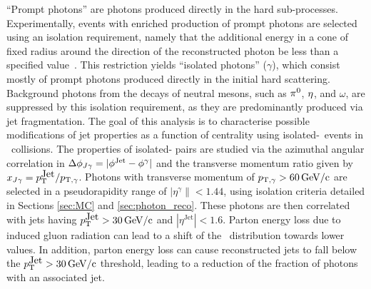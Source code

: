 ``Prompt photons'' are photons produced directly in the hard
sub-processes. Experimentally, events with enriched production of prompt photons are
selected using an isolation requirement, namely that the additional energy
in a cone of fixed radius around the direction of the reconstructed
photon be less than a specified value~\cite{HIPhoton}. This restriction
yields ``isolated photons'' ($\gamma$), which consist
mostly of prompt photons produced directly in the initial hard scattering.
Background photons from the decays of neutral mesons, such as $\pi^0$,
$\eta$, and $\omega$, are suppressed by this isolation requirement, as
they are predominantly produced via jet fragmentation.
The goal of this analysis is to characterise possible modifications of jet properties as a function of centrality using isolated-\photonjet\ events in \PbPb\ collisions.
The properties of isolated-\photonjet{} pairs are studied
via the azimuthal angular correlation in $\Delta\phi_{J\gamma} = |\phi^\mathrm{Jet} - \phi^{\gamma}|$ and the
transverse momentum ratio given by
$x_{J\gamma} = p_{\mathrm{T}}^{\mbox{Jet}}/p_{\mathrm{T},\gamma}$.
Photons with transverse momentum of
$p_{\mathrm{T},\gamma} > 60\,\mathrm{GeV/c}$ are selected in a pseudorapidity range of
$|\eta^\gamma\|<1.44$, using isolation criteria detailed in Sections \ref{sec:MC} and \ref{sec:photon_reco}.
These photons are then correlated with jets having $p_{\mathrm{T}}^{\mbox{Jet}} > 30\,\mathrm{GeV/c}$
and $|\eta^{\mbox{Jet}}|<1.6$.
Parton energy loss due to induced gluon radiation can lead to a shift of the \xjg\
distribution towards lower values.  In addition, parton energy loss
can cause reconstructed jets to fall below the $p_{\mathrm{T}}^{\mbox{Jet}} > 30\,\mathrm{GeV/c}$
threshold, leading to a reduction of the fraction of photons with an associated jet.

